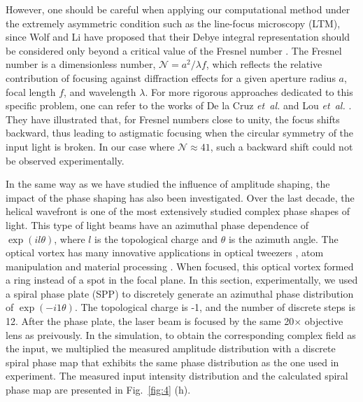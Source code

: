 \documentclass[9pt,twocolumn,twoside]{osajnl}
\begin{document}
However, one should be careful when applying our computational method under the extremely asymmetric condition such as the line-focus microscopy (LTM), since Wolf and Li have proposed that their Debye integral representation should be considered only beyond a critical value of the Fresnel number \cite{wolf1981conditions}. The Fresnel number is a dimensionless number, $\mathcal{N} = a^2/\lambda f$, which reflects the relative contribution of focusing against diffraction effects for a given aperture radius $a$, focal length $f$, and wavelength $\lambda$. For more rigorous approaches dedicated to this specific problem, one can refer to the works of De la Cruz \emph{et~al.} \cite{de2011modeling} and Lou \emph{et~al.} \cite{lou2018better}. They have illustrated that, for Fresnel numbers close to unity, the focus shifts backward, thus leading to astigmatic focusing when the circular symmetry of the input light is broken. In our case where $\mathcal{N}\approx 41$, such a backward shift could not be observed experimentally. %

In the same way as we have studied the influence of amplitude shaping, the impact of the phase shaping has also been investigated. Over the last decade, the helical wavefront is one of the most extensively studied complex phase shapes of light. This type of light beams have an azimuthal phase dependence of $\exp(il\theta)$, where $l$ is the topological charge and $\theta$ is the azimuth angle. The optical vortex has many innovative applications in optical tweezers \cite{padgett2011tweezers}, atom manipulation \cite{ladavac2004microoptomechanical} and material processing \cite{hnatovsky2010materials}. When focused, this optical vortex formed a ring instead of a spot in the focal plane. In this section, experimentally, we used a spiral phase plate (SPP) to discretely generate an azimuthal phase distribution of $\exp(-i1\theta)$. The topological charge is -1, and the number of discrete steps is 12. After the phase plate, the laser beam is focused by the same 20$\times$ objective lens as preivously. In the simulation, to obtain the corresponding complex field as the input, we multiplied the measured amplitude distribution with a discrete spiral phase map that exhibits the same phase distribution as the one used in experiment. The measured input intensity distribution and the calculated spiral phase map are presented in Fig.~\ref{fig:4} (h).
\end{document}
